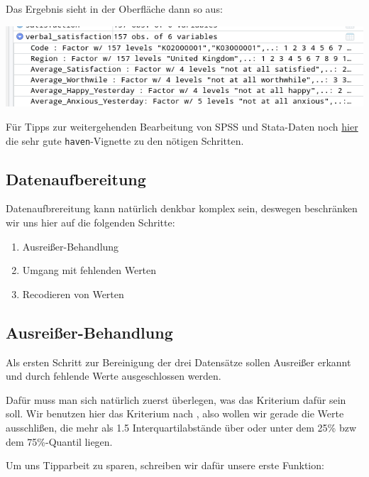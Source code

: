 \documentclass[
]{book}
\begin{document}
Das Ergebnis sieht in der Oberfläche dann so aus:

\begin{center}\includegraphics[width=0.8\linewidth]{imgs/spss2} \end{center}

Für Tipps zur weitergehenden Bearbeitung von SPSS und Stata-Daten noch \href{https://www.rdocumentation.org/packages/haven/versions/2.2.0/vignettes/semantics.Rmd}{hier} die sehr gute \texttt{haven}-Vignette zu den nötigen Schritten.

\hypertarget{datenaufbereitung}{%
\subsection{Datenaufbereitung}\label{datenaufbereitung}}

Datenaufbrereitung kann natürlich denkbar komplex sein, deswegen beschränken wir uns hier auf die folgenden Schritte:

\begin{enumerate}
\def\labelenumi{\arabic{enumi}.}
\item
  Ausreißer-Behandlung
\item
  Umgang mit fehlenden Werten
\item
  Recodieren von Werten
\end{enumerate}

\hypertarget{ausreiuxdfer-behandlung}{%
\subsection{Ausreißer-Behandlung}\label{ausreiuxdfer-behandlung}}

Als ersten Schritt zur Bereinigung der drei Datensätze sollen Ausreißer erkannt und durch fehlende Werte ausgeschlossen werden.

Dafür muss man sich natürlich zuerst überlegen, was das Kriterium dafür sein soll. Wir benutzen hier das Kriterium nach \citet{tukeyExploratoryDataAnalysis1977}, also wollen wir gerade die Werte ausschlißen, die mehr als 1.5 Interquartilabstände über oder unter dem 25\% bzw dem 75\%-Quantil liegen.

Um uns Tipparbeit zu sparen, schreiben wir dafür unsere erste Funktion:
\end{document}
